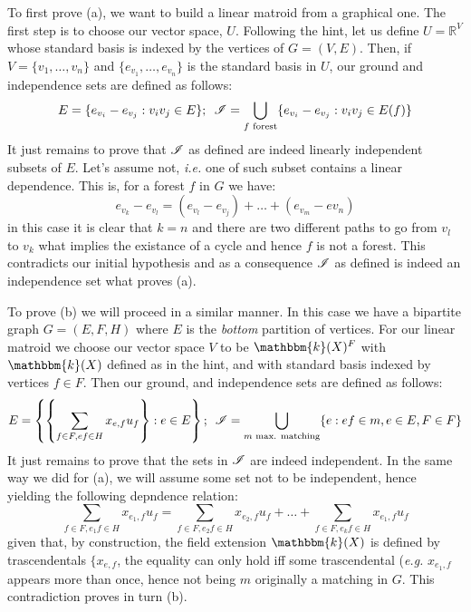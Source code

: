To first prove (a), we want to build a linear matroid from a graphical one.
The first step is to choose our vector space, $U$.
Following the hint, let us define $U = \mathbb{R}^V$ whose standard basis is indexed by the vertices of $G = (V, E)$.
Then, if $V = \lbrace v_1, \dots, v_n \rbrace$ and $\lbrace e_{v_1}, \dots, e_{v_n}\rbrace$ is the standard basis in $U$, our ground and independence sets are defined as follows:
\begin{equation*}
    \begin{split}
        E = \lbrace e_{v_i} - e_{v_j} : v_iv_j \in E \rbrace ;
        \hspace{5pt} \mathscr{I} = \bigcup_{f \text{ forest}} \lbrace e_{v_i} - e_{v_j} : v_iv_j \in E(f) \rbrace
    \end{split}
\end{equation*}
It just remains to prove that $\mathscr{I}$ as defined are indeed linearly independent subsets of $E$.
Let's assume not, \textit{i.e.} one of such subset contains a linear dependence.
This is, for a forest $f$ in $G$ we have:
\begin{equation*}
    e_{v_k} - e_{v_l} = (e_{v_l} - e_{v_j}) + \dots + (e_{v_m} - e{v_n})
\end{equation*}
in this case it is clear that $k = n$ and there are two different paths to go from $v_l$ to $v_k$ what implies the existance of a cycle and hence $f$ is not a forest.
This contradicts our initial hypothesis and as a consequence $\mathscr{I}$ as defined is indeed an independence set what proves (a).

To prove (b) we will proceed in a similar manner.
In this case we have a bipartite graph $G = (E, F, H)$ where $E$ is the \textit{bottom} partition of vertices.
For our linear matroid we choose our vector space $V$ to be $\mathbbm{k}(X)^F$ with $\mathbbm{k}(X)$ defined as in the hint, and with standard basis indexed by vertices $f \in F$.
Then our ground, and independence sets are defined as follows:
\begin{equation*}
    \begin{split}
        E = \left\lbrace \left\lbrace \sum_{f \in F, ef \in H} x_{e,f} u_f \right\rbrace : e \in E \right\rbrace ;
        \hspace{5pt} \mathscr{I} = \bigcup_{\text{$m$ max. matching}} \lbrace e : ef \in m, e \in E, F \in F \rbrace
    \end{split}
\end{equation*}
It just remains to prove that the sets in $\mathscr{I}$ are indeed independent.
In the same way we did for (a), we will assume some set not to be independent, hence yielding the following depndence relation:
\begin{equation*}
    \sum_{f \in F, e_1f \in H} x_{e_1,f} u_f = \sum_{f \in F, e_2f \in H} x_{e_2,f} u_f  + \dots + \sum_{f \in F, e_kf \in H} x_{e_1,f} u_f 
\end{equation*}
given that, by construction, the field extension $\mathbbm{k}(X)$ is defined by trascendentals $\lbrace x_{e,f}$, the equality can only hold iff some trascendental (\textit{e.g.} $x_{e_1,f}$ appears more than once, hence not being $m$ originally a matching in $G$.
This contradiction proves in turn (b).
